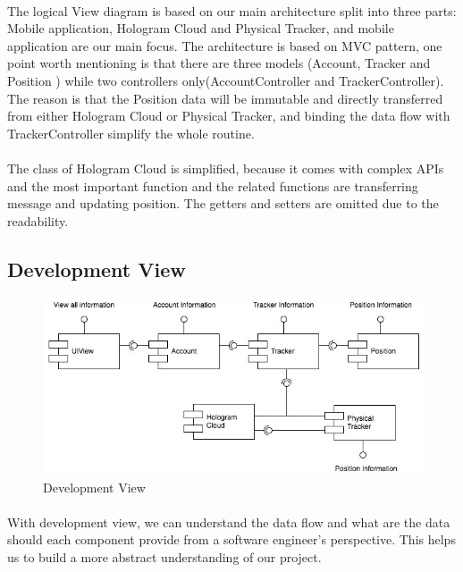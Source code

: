 \documentclass[12pt,a4paper]{article}
\begin{document}
        \paragraph{}
          The logical View diagram is based on our main architecture split into three parts: Mobile application, Hologram Cloud and Physical Tracker, and mobile application are our main focus. The architecture is based on MVC pattern, one point worth mentioning is that there are three models (Account, Tracker and Position ) while two controllers only(AccountController and TrackerController). The reason is that the Position data will be immutable and directly transferred from either Hologram Cloud or Physical Tracker, and binding the data flow with TrackerController simplify the whole routine.
        \paragraph{}
          The class of Hologram Cloud is simplified, because it comes with complex APIs and the most important function and the related functions are transferring message and updating position. The getters and setters are omitted due to the readability.
      
      \subsection{Development View}
        \begin{figure}[H]
          \centering
          \includegraphics[width=1\textwidth]{../assets/7-technical-architecture-development.jpg}
          \caption{Development View}
          \label{fig:Development View}
        \end{figure}
        \paragraph{}
         With development view, we can understand the data flow and what are the data should each component provide from a software engineer's perspective. This helps us to build a more abstract understanding of our project.
\end{document}
